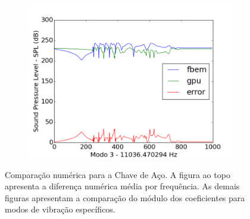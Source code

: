 \begin{figure}[ht]
\begin{subfigure}{0.45\textwidth}
	\includegraphics[width=\textwidth]{../data/transfer_test/steel_key/plots/steel_key-tfv-0_3.png}
	\caption{}
	\label{fig:coef_key_3}
\end{subfigure}
\caption[Comparação numérica para a Chave de Aço]{Comparação numérica para a Chave de Aço. A figura ao topo apresenta a diferença numérica média por frequência. As demais figuras apresentam a comparação do módulo dos coeficientes para modos de vibração específicos.}
\label{fig:coef_key_diff}
\end{figure}